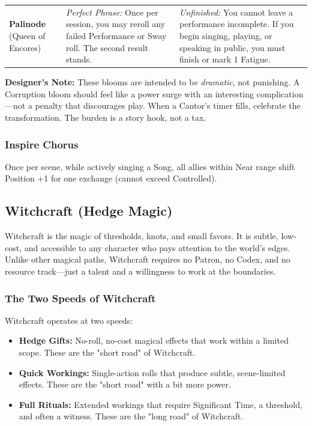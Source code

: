 \begin{longtable}{@{}p{3.2cm}p{4.8cm}p{4.8cm}@{}}
\begin{minipage}[t]{4.8cm}
\end{minipage} \\
\midrule
\textbf{Palinode} (Queen of Encores) &
\begin{minipage}[t]{4.8cm}
\vspace{0pt}
\textit{Perfect Phrase:} Once per session, you may reroll any failed Performance or Sway roll. The second result stands.
\end{minipage} &
\begin{minipage}[t]{4.8cm}
\vspace{0pt}
\textit{Unfinished:} You cannot leave a performance incomplete. If you begin singing, playing, or speaking in public, you must finish or mark 1 Fatigue.
\end{minipage} \\
\bottomrule
\end{longtable}

\noindent\textbf{Designer's Note:} These blooms are intended to be \textit{dramatic}, not punishing. A Corruption bloom should feel like a power surge with an interesting complication---not a penalty that discourages play. When a Cantor's timer fills, celebrate the transformation. The burden is a story hook, not a tax.

\subsubsection{Inspire Chorus}
Once per scene, while actively singing a Song, all allies within Near range shift Position +1 for one exchange (cannot exceed Controlled).

\subsection{Witchcraft (Hedge Magic)}
\label{sec:witchcraft-srd}

Witchcraft is the magic of thresholds, knots, and small favors. It is subtle, low-cost, and accessible to any character who pays attention to the world's edges. Unlike other magical paths, Witchcraft requires no Patron, no Codex, and no resource track---just a talent and a willingness to work at the boundaries.

\subsubsection{The Two Speeds of Witchcraft}

Witchcraft operates at two speeds:

\begin{itemize}
  \item \textbf{Hedge Gifts:} No-roll, no-cost magical effects that work within a limited scope. These are the "short road" of Witchcraft.
  \item \textbf{Quick Workings:} Single-action rolls that produce subtle, scene-limited effects. These are the "short road" with a bit more power.
  \item \textbf{Full Rituals:} Extended workings that require Significant Time, a threshold, and often a witness. These are the "long road" of Witchcraft.
\end{itemize}

